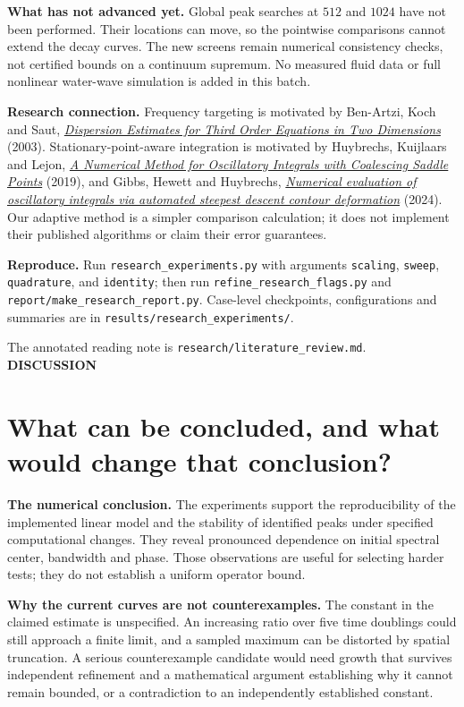\documentclass[10pt,letterpaper]{article}
\newcommand{\eyebrow}[1]{{\color{teal}\normalsize\bfseries #1}\par}
\begin{document}
\textbf{What has not advanced yet.} Global peak searches at $512$ and $1024$
have not been performed. Their locations can move, so the pointwise comparisons
cannot extend the decay curves. The new screens remain numerical consistency
checks, not certified bounds on a continuum supremum. No measured fluid data or
full nonlinear water-wave simulation is added in this batch.

\textbf{Research connection.} Frequency targeting is motivated by Ben-Artzi,
Koch and Saut, \href{https://doi.org/10.1081/PDE-120025491}{\emph{Dispersion Estimates
for Third Order Equations in Two Dimensions}} (2003). Stationary-point-aware
integration is motivated by Huybrechs, Kuijlaars and Lejon,
\href{https://arxiv.org/abs/1806.06549}{\emph{A Numerical Method for Oscillatory
Integrals with Coalescing Saddle Points}} (2019), and Gibbs, Hewett and Huybrechs,
\href{https://arxiv.org/abs/2307.07261}{\emph{Numerical evaluation of oscillatory
integrals via automated steepest descent contour deformation}} (2024).
Our adaptive method is a simpler comparison calculation; it does not implement
their published algorithms or claim their error guarantees.

\textbf{Reproduce.} Run \texttt{research\_experiments.py} with arguments
\texttt{scaling}, \texttt{sweep}, \texttt{quadrature}, and \texttt{identity}; then
run \texttt{refine\_research\_flags.py} and \texttt{report/make\_research\_report.py}.
Case-level checkpoints, configurations and summaries are in
\texttt{results/research\_experiments/}. \par The annotated reading note is \texttt{research/literature\_review.md}.
\newpage
{}\label{discussion}
\eyebrow{DISCUSSION}
\section*{What can be concluded, and what would change that conclusion?}
\textbf{The numerical conclusion.} The experiments support the reproducibility
of the implemented linear model and the stability of identified peaks under
specified computational changes. They reveal pronounced dependence on initial
spectral center, bandwidth and phase. Those observations are useful for selecting
harder tests; they do not establish a uniform operator bound.

\textbf{Why the current curves are not counterexamples.} The constant in the
claimed estimate is unspecified. An increasing ratio over five time doublings
could still approach a finite limit, and a sampled maximum can be distorted by
spatial truncation. A serious counterexample candidate would need growth that
survives independent refinement and a mathematical argument establishing why it
cannot remain bounded, or a contradiction to an independently established constant.
\end{document}
